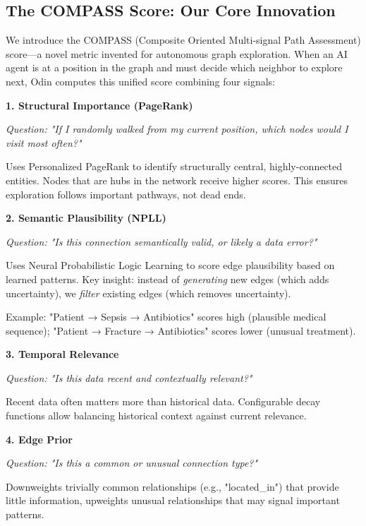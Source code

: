 \documentclass[11pt]{article}
\begin{document}
\subsection{The COMPASS Score: Our Core Innovation}

We introduce the COMPASS (Composite Oriented Multi-signal Path Assessment) score—a novel metric invented for autonomous graph exploration. When an AI agent is at a position in the graph and must decide which neighbor to explore next, Odin computes this unified score combining four signals:

\textbf{1. Structural Importance (PageRank)}

\textit{Question: "If I randomly walked from my current position, which nodes would I visit most often?"}

Uses Personalized PageRank to identify structurally central, highly-connected entities. Nodes that are hubs in the network receive higher scores. This ensures exploration follows important pathways, not dead ends.

\textbf{2. Semantic Plausibility (NPLL)}

\textit{Question: "Is this connection semantically valid, or likely a data error?"}

Uses Neural Probabilistic Logic Learning to score edge plausibility based on learned patterns. Key insight: instead of \textit{generating} new edges (which adds uncertainty), we \textit{filter} existing edges (which removes uncertainty).

Example: "Patient → Sepsis → Antibiotics" scores high (plausible medical sequence); "Patient → Fracture → Antibiotics" scores lower (unusual treatment).

\textbf{3. Temporal Relevance}

\textit{Question: "Is this data recent and contextually relevant?"}

Recent data often matters more than historical data. Configurable decay functions allow balancing historical context against current relevance.

\textbf{4. Edge Prior}

\textit{Question: "Is this a common or unusual connection type?"}

Downweights trivially common relationships (e.g., "located\_in") that provide little information, upweights unusual relationships that may signal important patterns.
\end{document}
